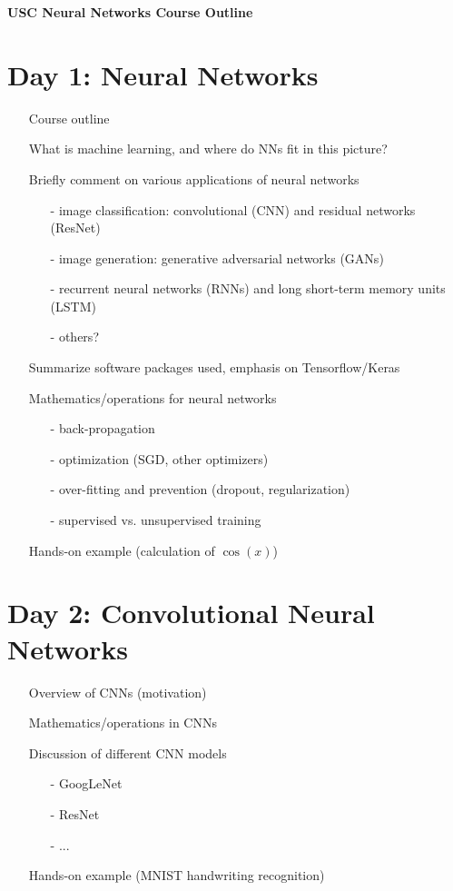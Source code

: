 \documentclass[10pt]{article}
\begin{document}
{\noindent\Large\textbf{USC Neural Networks Course Outline}}\\


\section*{Day 1: Neural Networks}
\begin{enumerate}
	\item[\textbullet] Course outline
	\item[\textbullet] What is machine learning, and where do NNs fit in this picture?
	\item[\textbullet] Briefly comment on various applications of neural networks
	\begin{enumerate}
		\item[-] image classification: convolutional (CNN) and residual networks (ResNet)
		\item[-] image generation: generative adversarial networks (GANs)
		\item[-] recurrent neural networks (RNNs) and long short-term memory units (LSTM)
		\item[-] others?
	\end{enumerate}
	\item[\textbullet] Summarize software packages used, emphasis on Tensorflow/Keras
	\item[\textbullet] Mathematics/operations for neural networks
	\begin{enumerate}
		\item[-] back-propagation
		\item[-] optimization (SGD, other optimizers)
		\item[-] over-fitting and prevention (dropout, regularization)
		\item[-] supervised vs. unsupervised training
	\end{enumerate}
	\item[\textbullet] Hands-on example (calculation of $\cos(x)$)
\end{enumerate}

\section*{Day 2: Convolutional Neural Networks}
\begin{enumerate}
	\item[\textbullet] Overview of CNNs (motivation)
	\item[\textbullet] Mathematics/operations in CNNs
	\item[\textbullet] Discussion of different CNN models
	\begin{enumerate}
		\item[-] GoogLeNet
		\item[-] ResNet
		\item[-] ...
	\end{enumerate}
	\item[\textbullet] Hands-on example (MNIST handwriting recognition)
\end{enumerate}
\end{document}
